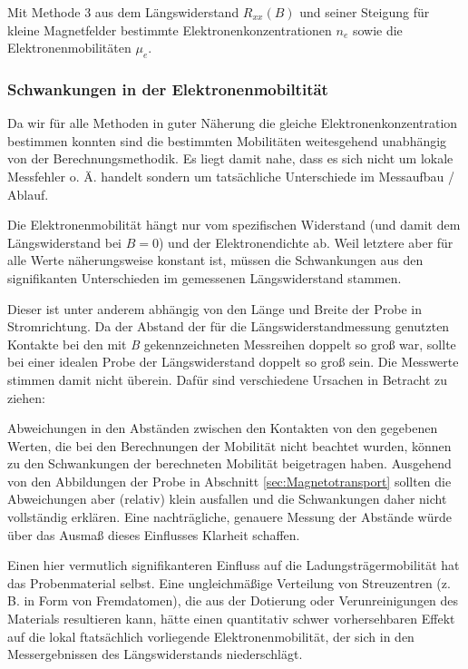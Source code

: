 \begin{table}[h]
	\centering
	\caption{Mit Methode 3 aus dem Längswiderstand $R_{xx}(B)$ und seiner Steigung für kleine Magnetfelder bestimmte Elektronenkonzentrationen $n_e$ sowie die Elektronenmobilitäten $\mu_e$.}
	
	\label{tab:Meth_3}
\end{table}

\subsubsection{Schwankungen in der Elektronenmobiltität} \label{sec:Schwankungen}
Da wir für alle Methoden in guter Näherung die gleiche Elektronenkonzentration bestimmen konnten sind die bestimmten Mobilitäten weitesgehend unabhängig von der Berechnungsmethodik. Es liegt damit nahe, dass es sich nicht um lokale Messfehler o. Ä. handelt sondern um tatsächliche Unterschiede im Messaufbau / Ablauf. 

Die Elektronenmobilität hängt nur vom spezifischen Widerstand (und damit dem Längswiderstand bei $ B = 0 $) und der Elektronendichte ab. Weil letztere aber für alle Werte näherungsweise konstant ist, müssen die Schwankungen aus den signifikanten Unterschieden im gemessenen Längswiderstand stammen. 

Dieser ist unter anderem abhängig von den Länge und Breite der Probe in Stromrichtung. Da der Abstand der für die Längswiderstandmessung genutzten Kontakte bei den mit \emph{B} gekennzeichneten Messreihen doppelt so groß war, sollte bei einer idealen Probe der Längswiderstand doppelt so groß sein. Die Messwerte stimmen damit nicht überein.
Dafür sind verschiedene Ursachen in Betracht zu ziehen:

Abweichungen in den Abständen zwischen den Kontakten von den gegebenen Werten, die bei den Berechnungen der Mobilität nicht beachtet wurden, können zu den Schwankungen der berechneten Mobilität beigetragen haben. Ausgehend von den Abbildungen der Probe in Abschnitt \ref{sec:Magnetotransport} sollten die Abweichungen aber (relativ) klein ausfallen und die Schwankungen daher nicht vollständig erklären. Eine nachträgliche, genauere Messung der Abstände würde über das Ausmaß dieses Einflusses Klarheit schaffen.

Einen hier vermutlich signifikanteren Einfluss auf die Ladungsträgermobilität hat das Probenmaterial selbst. Eine ungleichmäßige Verteilung von Streuzentren (z. B. in Form von Fremdatomen), die aus der Dotierung oder Verunreinigungen des Materials resultieren kann, hätte einen quantitativ schwer vorhersehbaren Effekt auf die lokal ftatsächlich vorliegende Elektronenmobilität, der sich in den Messergebnissen des Längswiderstands niederschlägt. 

